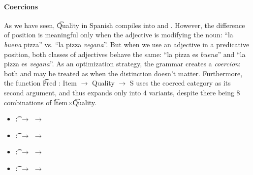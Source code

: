 \paragraph{Coercions}
\label{sec:Coercions}
As we have seen, \t{Quality} in Spanish compiles into  and
. However, the difference of position is meaningful only when the
adjective is modifying the noun: ``la \emph{buena} pizza'' vs. ``la pizza
\emph{vegana}''. But when we use an adjective in a predicative position, both
classes of adjectives behave the same: ``la pizza es \emph{buena}''
and ``la pizza es \emph{vegana}''. As an optimization strategy, the
grammar creates a {\it coercion}: both  and 
may be treated as \quality{*} when the distinction doesn't matter. 
Furthermore, the function \t{Pred : Item $\rightarrow$ Quality $\rightarrow$ S} uses
the coerced category \quality{*} as its second argument, and thus
expands only into 4 variants, despite there being 8 combinations of
\t{Item}$\times$\t{Quality}.

\begin{itemize}
\setlength\itemsep{0em}
\item {} \t{:}  $\rightarrow$ \quality{*} $\rightarrow$ \comment
\item  {} \t{:}  $\rightarrow$ \quality{*} $\rightarrow$ \comment
\item  {} \t{:}  $\rightarrow$ \quality{*} $\rightarrow$ \comment
\item {} \t{:}  $\rightarrow$ \quality{*} $\rightarrow$ \comment
\end{itemize}